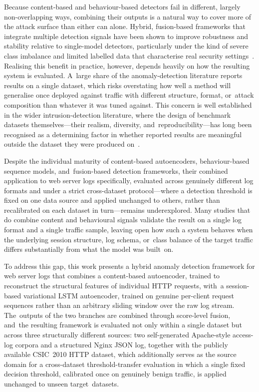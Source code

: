 \documentclass[futureinternet,article,accept,moreauthors]{Definitions/mdpi}
\begin{document}
Because content-based and behaviour-based detectors fail in different, largely non-overlapping ways, combining their outputs is a natural way to cover more of the attack surface than either can alone. Hybrid, fusion-based frameworks that integrate multiple detection signals have been shown to improve robustness and stability relative to single-model detectors, particularly under the kind of severe class imbalance and limited labelled data that characterise real security settings~\cite{kamal2025}. Realising this benefit in practice, however, depends heavily on how the resulting system is evaluated. A~large share of the anomaly-detection literature reports results on a single dataset, which risks overstating how well a method will generalise once deployed against traffic with different structure, format, or~attack composition than whatever it was tuned against. This concern is well established in the wider intrusion-detection literature, where the design of benchmark datasets themselves---their realism, diversity, and~reproducibility---has long been recognised as a determining factor in whether reported results are meaningful outside the dataset they were produced on~\cite{shiravi2012}.

Despite the individual maturity of content-based autoencoders, behaviour-based sequence models, and~fusion-based detection frameworks, their combined application to web server logs specifically, evaluated across genuinely different log formats and under a strict cross-dataset protocol---where a detection threshold is fixed on one data source and applied unchanged to others, rather than recalibrated on each dataset in turn---remains underexplored. Many studies that do combine content and behavioural signals validate the result on a single log format and a single traffic sample, leaving open how such a system behaves when the underlying session structure, log schema, or~class balance of the target traffic differs substantially from what the model was built~on.

To address this gap, this work presents a hybrid anomaly detection framework for web server logs that combines a content-based autoencoder, trained to reconstruct the structural features of individual HTTP requests, with~a session-based variational LSTM autoencoder, trained on genuine per-client request sequences rather than an arbitrary sliding window over the raw log stream. The~outputs of the two branches are combined through score-level fusion, and~the resulting framework is evaluated not only within a single dataset but across three structurally different sources: two self-generated Apache-style access-log corpora and a structured Nginx JSON log, together with the publicly available CSIC~2010 HTTP dataset, which additionally serves as the source domain for a cross-dataset threshold-transfer evaluation in which a single fixed decision threshold, calibrated once on genuinely benign traffic, is applied unchanged to unseen target~datasets.
\end{document}
